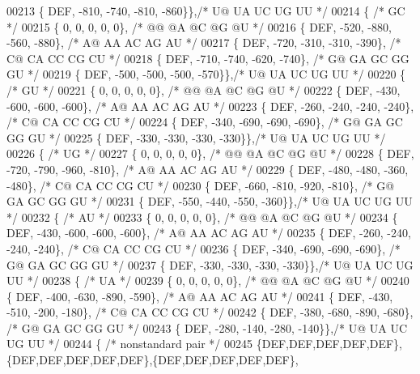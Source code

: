 \begin{DoxyCode}
00213    \{ DEF, -810, -740, -810, -860\}\},\textcolor{comment}{/* U@  UA  UC  UG  UU */}
00214   \{ \textcolor{comment}{/* GC */}
00215    \{   0,    0,    0,    0,    0\}, \textcolor{comment}{/* @@  @A  @C  @G  @U */}
00216    \{ DEF, -520, -880, -560, -880\}, \textcolor{comment}{/* A@  AA  AC  AG  AU */}
00217    \{ DEF, -720, -310, -310, -390\}, \textcolor{comment}{/* C@  CA  CC  CG  CU */}
00218    \{ DEF, -710, -740, -620, -740\}, \textcolor{comment}{/* G@  GA  GC  GG  GU */}
00219    \{ DEF, -500, -500, -500, -570\}\},\textcolor{comment}{/* U@  UA  UC  UG  UU */}
00220   \{ \textcolor{comment}{/* GU */}
00221    \{   0,    0,    0,    0,    0\}, \textcolor{comment}{/* @@  @A  @C  @G  @U */}
00222    \{ DEF, -430, -600, -600, -600\}, \textcolor{comment}{/* A@  AA  AC  AG  AU */}
00223    \{ DEF, -260, -240, -240, -240\}, \textcolor{comment}{/* C@  CA  CC  CG  CU */}
00224    \{ DEF, -340, -690, -690, -690\}, \textcolor{comment}{/* G@  GA  GC  GG  GU */}
00225    \{ DEF, -330, -330, -330, -330\}\},\textcolor{comment}{/* U@  UA  UC  UG  UU */}
00226   \{ \textcolor{comment}{/* UG */}
00227    \{   0,    0,    0,    0,    0\}, \textcolor{comment}{/* @@  @A  @C  @G  @U */}
00228    \{ DEF, -720, -790, -960, -810\}, \textcolor{comment}{/* A@  AA  AC  AG  AU */}
00229    \{ DEF, -480, -480, -360, -480\}, \textcolor{comment}{/* C@  CA  CC  CG  CU */}
00230    \{ DEF, -660, -810, -920, -810\}, \textcolor{comment}{/* G@  GA  GC  GG  GU */}
00231    \{ DEF, -550, -440, -550, -360\}\},\textcolor{comment}{/* U@  UA  UC  UG  UU */}
00232   \{ \textcolor{comment}{/* AU */}
00233    \{   0,    0,    0,    0,    0\}, \textcolor{comment}{/* @@  @A  @C  @G  @U */}
00234    \{ DEF, -430, -600, -600, -600\}, \textcolor{comment}{/* A@  AA  AC  AG  AU */}
00235    \{ DEF, -260, -240, -240, -240\}, \textcolor{comment}{/* C@  CA  CC  CG  CU */}
00236    \{ DEF, -340, -690, -690, -690\}, \textcolor{comment}{/* G@  GA  GC  GG  GU */}
00237    \{ DEF, -330, -330, -330, -330\}\},\textcolor{comment}{/* U@  UA  UC  UG  UU */}
00238   \{ \textcolor{comment}{/* UA */}
00239    \{   0,    0,    0,    0,    0\}, \textcolor{comment}{/* @@  @A  @C  @G  @U */}
00240    \{ DEF, -400, -630, -890, -590\}, \textcolor{comment}{/* A@  AA  AC  AG  AU */}
00241    \{ DEF, -430, -510, -200, -180\}, \textcolor{comment}{/* C@  CA  CC  CG  CU */}
00242    \{ DEF, -380, -680, -890, -680\}, \textcolor{comment}{/* G@  GA  GC  GG  GU */}
00243    \{ DEF, -280, -140, -280, -140\}\},\textcolor{comment}{/* U@  UA  UC  UG  UU */}
00244   \{ \textcolor{comment}{/* nonstandard pair */}
00245    \{DEF,DEF,DEF,DEF,DEF\},\{DEF,DEF,DEF,DEF,DEF\},\{DEF,DEF,DEF,DEF,DEF\},

\end{DoxyCode}
